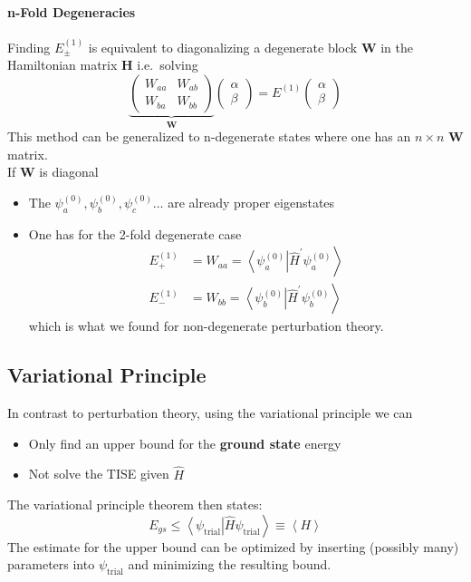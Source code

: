 \paragraph{n-Fold Degeneracies}
Finding $E_{\pm}^{(1)}$ is equivalent to diagonalizing a degenerate block $\mathbf{W}$ in the Hamiltonian matrix $\mathbf{H}$ i.e.\ solving
\begin{equation*}
    \underbrace{
        \left(\begin{array}{cc}
            W_{aa} & W_{ab} \\
            W_{ba} & W_{bb}
        \end{array}\right)}_{\mathbf{W}}
    \left(\begin{array}{c}
            \alpha \\
            \beta
        \end{array}\right)
    =E^{(1)}\left(\begin{array}{c}
            \alpha \\
            \beta
        \end{array}\right)
\end{equation*}
This method can be generalized to n-degenerate states where one has an $n\times n$ $\mathbf{W}$ matrix.\\
If $\mathbf{W}$ is diagonal
\begin{itemize}
    \item The $\psi_a^{(0)},\psi_b^{(0)},\psi_c^{(0)} \dots $ are already proper eigenstates
    \item One has for the 2-fold degenerate case
          \begin{align*}
              E_{+}^{(1)} & =W_{aa}=\left\langle\psi_{a}^{(0)}\right|\left.\widehat{H}^{\prime}\psi_{a}^{(0)}\right\rangle \\
              E_{-}^{(1)} & =W_{bb}=\left\langle\psi_{b}^{(0)}\right|\left.\widehat{H}^{\prime}\psi_{b}^{(0)}\right\rangle
          \end{align*}
          which is what we found for non-degenerate perturbation theory.
\end{itemize}

\subsection{Variational Principle}
In contrast to perturbation theory, using the variational principle we can
\begin{itemize}
    \item Only find an upper bound for the \textbf{ground state} energy
    \item Not solve the TISE given $\widehat{H}$
\end{itemize}
The variational principle theorem then states:
\begin{equation*}
    E_{gs}\leq\left\langle\psi_{\mathrm{trial}}\right|\widehat{H} \psi_{\mathrm{trial}}\left.\right\rangle \equiv \left<H\right>
\end{equation*}
The estimate for the upper bound can be optimized by inserting (possibly many) parameters into $ \psi_{\mathrm{trial}}$ and minimizing the resulting bound.


